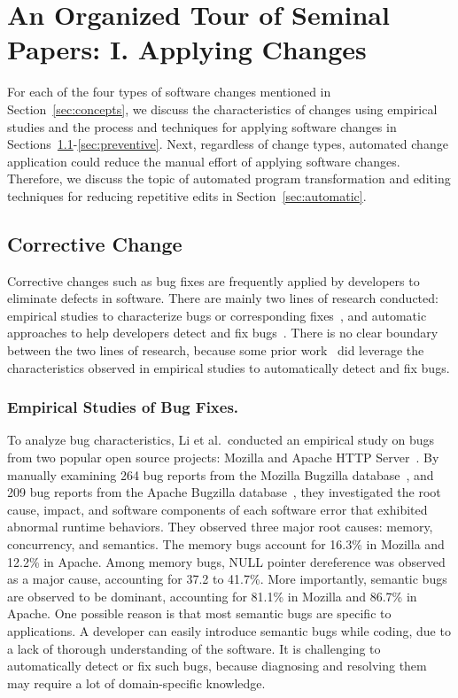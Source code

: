 \documentclass[runningheads,a4paper]{llncs}
\begin{document}
\section{An Organized Tour of Seminal Papers: I. Applying Changes}
\label{sec:apply}

For each of the four types of software changes mentioned in Section~\ref{sec:concepts}, we discuss the characteristics of changes using empirical studies and the process and techniques for applying software changes in Sections~\ref{sec:corrective}-\ref{sec:preventive}. Next, regardless of change types, automated change application could reduce the manual effort of applying software changes. Therefore, we discuss the topic of automated program transformation and editing techniques for reducing repetitive edits in Section~\ref{sec:automatic}.

\subsection{Corrective Change}
\label{sec:corrective}
Corrective changes such as bug fixes are frequently applied by developers to eliminate defects in software. There are mainly two lines of research conducted: empirical studies to characterize bugs or corresponding fixes~\cite{Fenton2000:QAF,Li2006:TCE,Kim2006:MBF,Lu2008:LMC,Nguyen2010:RBF,Yin2011:FBB,Park2012:supplementary,Zhong2015:ESR}, and automatic approaches to help developers detect and fix bugs~\cite{Engler2000:CSR,Bush2000:SAF,Hangal2002:TDS,Hovemeyer2004:FBE,Naik2006:ESR,Weimer2009:AFP}. There is no clear boundary between the two lines of research, because some prior work~\cite{Li2006:CPMiner,Pham2010:DRS,Jin2012:UDR,Kim2013:PAR} did leverage the characteristics observed in empirical studies to automatically detect and fix bugs.

\subsubsection{Empirical Studies of Bug Fixes.}
To analyze bug characteristics, Li et al.~conducted an empirical study on bugs from two popular open source projects: Mozilla and Apache HTTP Server~\cite{Li2006:TCE}. By manually examining 264 bug reports from the Mozilla Bugzilla database~\cite{mozilla}, and 209 bug reports from the Apache Bugzilla database~\cite{asf}, they investigated the root cause, impact, and software components of each software error that exhibited abnormal runtime behaviors. They observed three major root causes: memory, concurrency, and semantics. The memory bugs account for 16.3\% in Mozilla and 12.2\% in Apache. Among memory bugs, NULL pointer dereference was observed as a major cause, accounting for 37.2 to 41.7\%. More importantly, semantic bugs are observed to be dominant, accounting for 81.1\% in Mozilla and 86.7\% in Apache. One possible reason is that most semantic bugs are specific to applications. A developer can easily introduce semantic bugs while coding, due to a lack of thorough understanding of the software. It is challenging to automatically detect or fix such bugs, because diagnosing and resolving them may require a lot of domain-specific knowledge.
\end{document}
